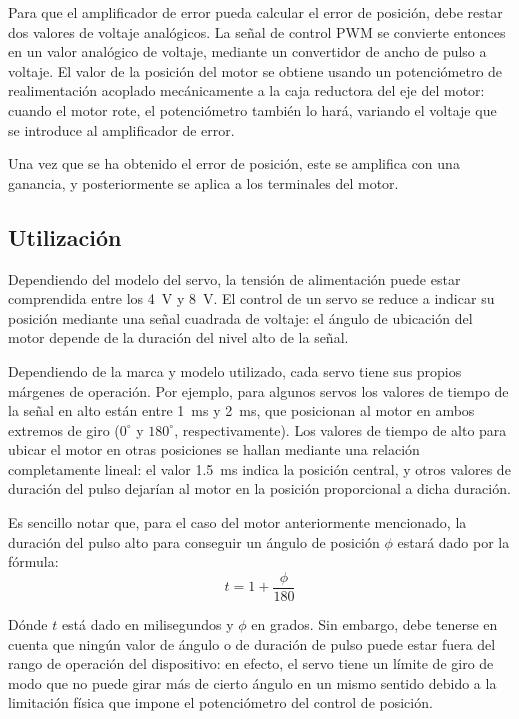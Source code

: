 \documentclass[../main]{subfiles}
\begin{document}

Para que el amplificador de error pueda calcular el error de posici\'on{}, debe restar dos valores de voltaje anal\'ogicos. La se\~nal{} de control PWM se convierte entonces en un valor anal\'ogico{} de voltaje, mediante un convertidor de ancho de pulso a voltaje. El valor de la posici\'on{} del motor se obtiene usando un potenci\'ometro{} de realimentaci\'on{} acoplado mec\'anicamente{} a la caja reductora del eje del motor: cuando el motor rote, el potenci\'ometro{} tambi\'e{}n lo har\'a{}, variando el voltaje que se introduce al amplificador de error.

Una vez que se ha obtenido el error de posici\'on{}, este se amplifica con una ganancia, y posteriormente se aplica a los terminales del motor.

\subsection{Utilizaci\'on{}}
Dependiendo del modelo del servo, la tensi\'on{} de alimentaci\'on{} puede estar comprendida entre los \qty{4}{V} y \qty{8}{V}. El control de un servo se reduce a indicar su posici\'on{} mediante una se\~nal{} cuadrada de voltaje: el \'angulo{} de ubicaci\'on{} del motor depende de la duraci\'on{} del nivel alto de la se\~nal{}.

Dependiendo de la marca y modelo utilizado, cada servo tiene sus propios m\'argenes{} de operaci\'on{}. Por ejemplo, para algunos servos los valores de tiempo de la se\~nal{} en alto est\'an{} entre \qty{1}{ms} y \qty{2}{ms}, que posicionan al motor en ambos extremos de giro ($0^\circ$ y $180^\circ$, respectivamente). Los valores de tiempo de alto para ubicar el motor en otras posiciones se hallan mediante una relaci\'on{} completamente lineal: el valor \qty{1,5}{ms} indica la posici\'on{} central, y otros valores de duraci\'on{} del pulso dejar\'ian{} al motor en la posici\'on{} proporcional a dicha duraci\'on{}.

Es sencillo notar que, para el caso del motor anteriormente mencionado, la duraci\'on{} del pulso alto para conseguir un \'angulo{} de posici\'on{} $\phi$ estar\'a{} dado por la f\'ormula{}:
\begin{equation}
t = 1 + \frac{\phi}{180}
\end{equation}

D\'onde{} $t$ est\'a{} dado en milisegundos y $\phi$ en grados. Sin embargo, debe tenerse en cuenta que ning\'un{} valor de \'angulo{} o de duraci\'on{} de pulso puede estar fuera del rango de operaci\'on{} del dispositivo: en efecto, el servo tiene un l\'imite{} de giro de modo que no puede girar m\'as{} de cierto \'angulo{} en un mismo sentido debido a la limitaci\'on{} f\'isica{} que impone el potenci\'ometro{} del control de posici\'on{}.
\end{document}

